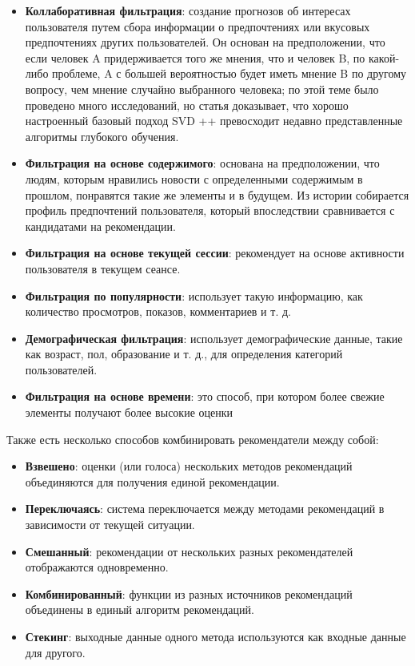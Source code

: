\documentclass[14pt]{matmex-diploma-custom}
\begin{document}
\begin {itemize}
    \item \textbf {Коллаборативная фильтрация}: создание прогнозов об интересах пользователя путем сбора информации о предпочтениях или вкусовых предпочтениях других пользователей. Он основан на предположении, что если человек A придерживается того же мнения, что и человек B, по какой-либо проблеме, A с большей вероятностью будет иметь мнение B по другому вопросу, чем мнение случайно выбранного человека; по этой теме было проведено много исследований, но статья \citep{evaluation} доказывает, что хорошо настроенный базовый подход SVD ++ превосходит недавно представленные алгоритмы глубокого обучения.
    \item \textbf {Фильтрация на основе содержимого}: основана на предположении, что людям, которым нравились новости с определенными содержимым в прошлом, понравятся такие же элементы и в будущем. Из истории собирается профиль предпочтений пользователя, который впоследствии сравнивается с кандидатами на рекомендации.
    \item \textbf {Фильтрация на основе текущей сессии}: рекомендует на основе активности пользователя в текущем сеансе.
    \item \textbf {Фильтрация по популярности}: использует такую информацию, как количество просмотров, показов, комментариев и т. д.
    \item \textbf {Демографическая фильтрация}: использует демографические данные, такие как возраст, пол, образование и т. д., для определения категорий пользователей.
    \item \textbf {Фильтрация на основе времени}: это способ, при котором более свежие элементы получают более высокие оценки
\end {itemize}

Также есть несколько способов \citep {survey1} комбинировать рекомендатели между собой:

\begin {itemize}
    \item \textbf {Взвешено}: оценки (или голоса) нескольких методов рекомендаций объединяются для получения единой рекомендации.
    \item \textbf {Переключаясь}: система переключается между методами рекомендаций в зависимости от текущей ситуации.
    \item \textbf {Смешанный}: рекомендации от нескольких разных рекомендателей отображаются одновременно.
    \item \textbf {Комбинированный}: функции из разных источников рекомендаций объединены в единый алгоритм рекомендаций.
    \item \textbf {Стекинг}: выходные данные одного метода используются как входные данные для другого.

\end {itemize}
\end{document}
